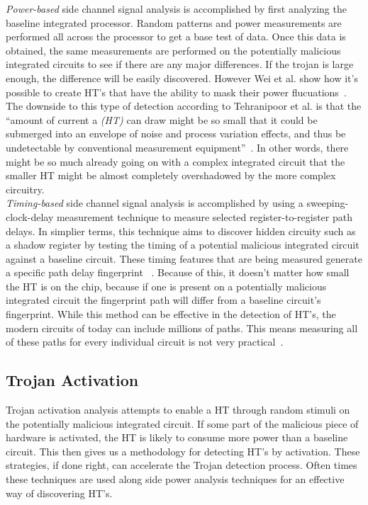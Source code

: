 \documentclass[letterpaper,twocolumn,11pt]{article}
\begin{document}
{\em Power-based} side channel signal analysis is accomplished by first analyzing the baseline integrated processor. Random patterns and power measurements are performed all across the processor to get a base test of data. Once this data is obtained, the same measurements are performed on the potentially malicious integrated circuits to see if there are any major differences. If the trojan is large enough, the difference will be easily discovered. However Wei et al. show how it's possible to create HT's that have the ability to mask their power flucuations~\cite {wei}. The downside to this type of detection according to Tehranipoor et al. is that the ``amount of current a {\em (HT)} can draw might be so small that it could be submerged into an envelope of noise and process variation effects, and thus be undetectable by conventional measurement equipment''~\cite {teh}. In other words, there might be so much already going on with a complex integrated circuit that the smaller HT might be almost completely overshadowed by the more complex circuitry. \\ 

{\em Timing-based} side channel signal analysis is accomplished by using a sweeping-clock-delay measurement technique to measure selected register-to-register path delays. In simplier terms, this technique aims to discover hidden circuity such as a shadow register by testing the timing of a potential malicious integrated circuit against a baseline circuit. These timing features that are being measured generate a specific path delay fingerprint ~\cite {teh}. Because of this, it doesn't matter how small the HT is on the chip, because if one is present on a potentially malicious integrated circuit the fingerprint path will differ from a baseline circuit's fingerprint. While this method can be effective in the detection of HT's, the modern circuits of today can include millions of paths. This means measuring all of these paths for every individual circuit is not very practical~\cite {teh}. 

\subsection{Trojan Activation}
Trojan activation analysis attempts to enable a HT through random stimuli on the potentially malicious integrated circuit. If some part of the malicious piece of hardware is activated, the HT is likely to consume more power than a baseline circuit. This then gives us a methodology for detecting HT's by activation. These strategies, if done right, can accelerate the Trojan detection process. Often times these techniques are used along side power analysis techniques for an effective way of discovering HT's. \\
\end{document}
